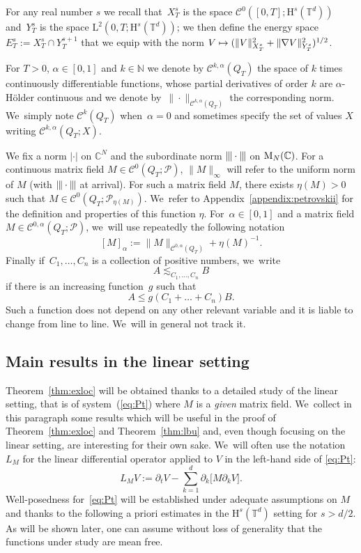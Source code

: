 \documentclass[JEP,XML,SOM,Unicode,published]{cedram}
\newcommand\mto{\mathchoice{\longmapsto}{\mapsto}{\mapsto}{\mapsto}}
\theoremstyle{definition}
\newcommand\N{\mathbb{N}}
\newcommand\T{\mathbb{T}}
\renewcommand\H{\mathrm{H}}
\renewcommand\L{\mathrm{L}}
\newcommand{\vertiii}[1]{{\vert\kern-0.08em\vert\kern-0.08em\vert #1 \vert\kern-0.08em\vert\kern-0.08em\vert}}
\begin{document}
For any real number $s$ we recall that~$X_T^s$ is the space $\mathscr{C}^0([0,T];\H^s(\T^d))$ and~$Y_T^s$ is the space $\L^2(0,T;\H^{s}(\T^d))$; we then define the energy space $E_T^s:=X_T^s \cap Y_T^{s+1}$ that we equip with the norm $V\mto (\|V\|_{X_T^s}^2 + \|\nabla V\|_{Y_T^s}^2)^{1/2}$.

For $T>0$, $\alpha\in[0,1]$ and $k\in\N$ we denote by $\mathscr{C}^{k,\alpha}(Q_T)$ the space of $k$ times continuously differentiable functions, whose partial derivatives of order $k$ are $\alpha$-Hölder continuous and we denote by~$\|{\cdot}\|_{\mathscr{C}^{k,\alpha}(Q_T)}$ the corresponding norm. We~simply note $\mathscr{C}^k(Q_T)$ when~$\alpha=0$ and sometimes specify the set of values $X$ writing $\mathscr{C}^{k,\alpha}(Q_T;X)$.

We fix a norm $|{{\cdot}}|$ on $\mathbb{C}^N$ and the subordinate norm $\vertiii{\cdot}$ on $\textnormal{M}_N(\mathbb{C})$. For a continuous matrix field $M\in\mathscr{C}^0(Q_T;\mathscr{P})$, $\|M\|_\infty$ will refer to the uniform norm of $M$ (with $\vertiii{\cdot}$ at arrival). For such a matrix field $M$, there exists $\eta(M)>0$ such that $M\in\mathscr{C}^0(Q_T;\mathscr{P}_{\eta(M)})$. We~refer to Appendix~\ref{appendix:petrovskii} for the definition and properties of this function $\eta$.
For~$\alpha\in[0,1]$ and a matrix field $M\in\mathscr{C}^{0,\alpha}(Q_T;\mathscr{P})$, we~will use repeatedly the following notation
\begin{equation}\label{defnormalpha}
[M]_{\alpha}:= \|M\|_{\mathscr{C}^{0,\alpha}(Q_T)}+\eta(M)^{-1}.
\end{equation}
Finally if~$C_1,\dots,C_n$ is a collection of positive numbers, we~write
\[
A \lesssim_{C_1,\dots,C_n} B
\]
if there is an increasing function~$g$ such that
\[
A \leq g(C_1+\dots+C_n) B.
\]
Such a function does not depend on any other relevant variable and it is liable to change from line to line. We~will in general not track it.
\subsection{Main results in the linear setting}
Theorem~\ref{thm:exloc} will be obtained thanks to a detailed study of the linear setting, that is of system~(\ref{eq:Pt}) where $M$ is a \emph{given} matrix field. We~collect in this paragraph some results which will be useful in the proof of Theorem~\ref{thm:exloc} and Theorem~\ref{thm:lbu} and, even though focusing on the linear setting, are interesting for their own sake. We~will often use the notation $L_M$ for the linear differential operator applied to $V$ in the left-hand side of \eqref{eq:Pt}:
\[
L_M V:= \partial_t V - \sum_{k=1}^d \partial_k\bigl[M\partial_k V \bigr].
\]
Well-posedness for~\eqref{eq:Pt} will be established under adequate assumptions on $M$ and thanks to the following a priori estimates in the $\H^s(\T^d)$ setting for $s>d/2$. As will be shown later, one can assume without loss of generality that the functions under study are mean free.
\end{document}
